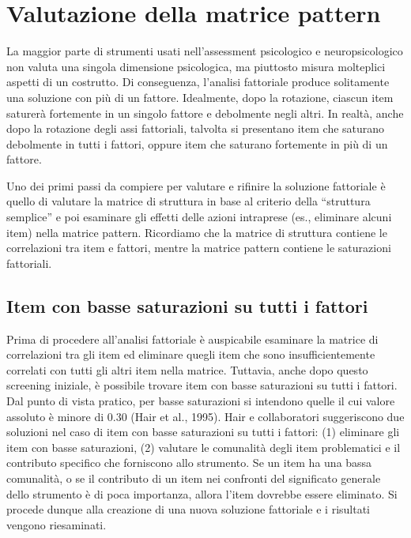 \documentclass[
  11pt,
]{krantz}
\theoremstyle{definition}
\theoremstyle{definition}
\theoremstyle{definition}
\theoremstyle{definition}
\theoremstyle{remark}
\begin{document}
\hypertarget{valutazione-della-matrice-pattern}{%
\section{Valutazione della matrice pattern}\label{valutazione-della-matrice-pattern}}

La maggior parte di strumenti usati nell'assessment psicologico e neuropsicologico non valuta una singola dimensione psicologica, ma piuttosto misura molteplici aspetti di un costrutto. Di conseguenza, l'analisi fattoriale produce solitamente una soluzione con più di un fattore. Idealmente, dopo la rotazione, ciascun item saturerà fortemente in un singolo fattore e debolmente negli altri. In realtà, anche dopo la rotazione degli assi fattoriali, talvolta si presentano item che saturano debolmente in tutti i fattori, oppure item che saturano fortemente in più di un fattore.

Uno dei primi passi da compiere per valutare e rifinire la soluzione fattoriale è quello di valutare la matrice di struttura in base al criterio della ``struttura semplice'' e poi esaminare gli effetti delle azioni intraprese (es., eliminare alcuni item) nella matrice pattern. Ricordiamo che la matrice di struttura contiene le correlazioni tra item e fattori, mentre la matrice pattern contiene le saturazioni fattoriali.

\hypertarget{item-con-basse-saturazioni-su-tutti-i-fattori}{%
\subsection{Item con basse saturazioni su tutti i fattori}\label{item-con-basse-saturazioni-su-tutti-i-fattori}}

Prima di procedere all'analisi fattoriale è auspicabile esaminare la matrice di correlazioni tra gli item ed eliminare quegli item che sono insufficientemente correlati con tutti gli altri item nella matrice. Tuttavia, anche dopo questo screening iniziale, è possibile trovare item con basse saturazioni su tutti i fattori. Dal punto di vista pratico, per basse saturazioni si intendono quelle il cui valore assoluto è minore di 0.30 (Hair et al., 1995). Hair e collaboratori suggeriscono due soluzioni nel caso di item con basse saturazioni su tutti i fattori: (1) eliminare gli item con basse saturazioni, (2) valutare le comunalità degli item problematici e il contributo specifico che forniscono allo strumento. Se un item ha una bassa comunalità, o se il contributo di un item nei confronti del significato generale dello strumento è di poca importanza, allora l'item dovrebbe essere eliminato. Si procede dunque alla creazione di una nuova soluzione fattoriale e i risultati vengono riesaminati.
\end{document}
